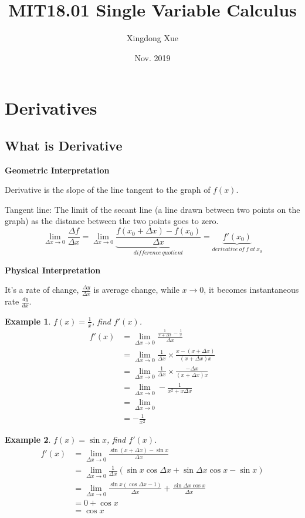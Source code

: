 \documentclass{article}
\title{MIT18.01 Single Variable Calculus}
\author{Xingdong Xue}
\date{Nov. 2019}
\newtheorem{exmp}{Example}
\newcommand\limitdeltaxzero{\lim_{\Delta x \to 0}}
\begin{document}
\maketitle

\section{Derivatives}
\subsection{What is Derivative}

\textbf{Geometric Interpretation}

Derivative is the slope of the line tangent to the graph of $f(x)$.

Tangent line: The limit of the secant line (a line drawn between two points on the graph) as the distance between the two points goes to zero.
$$\limitdeltaxzero \frac{\Delta f}{\Delta x} = \limitdeltaxzero \underbrace{\frac{f(x_0+\Delta x)-f(x_0)}{\Delta x}}_{difference\ quotient} = \underbrace{f'(x_0)}_{derivative\ of\ f\ at\ x_0}$$

\textbf{Physical Interpretation}

It's a rate of change, $\frac{\Delta y}{\Delta x}$ is average change, while $x \rightarrow 0$, it becomes instantaneous rate $\frac{dy}{dx}$.

\begin{exmp}
$f(x) = \frac{1}{x}$, find $f'(x)$.
  \begin{align*}
    f'(x) &= \limitdeltaxzero\frac{\frac{1}{x+\Delta x} - \frac{1}{x}}{\Delta x} \\
          &= \limitdeltaxzero\frac{1}{\Delta x} \times \frac{x - (x+\Delta x)}{(x+\Delta x)x} \\
          &= \limitdeltaxzero\frac{1}{\Delta x} \times \frac{-\Delta x}{(x+\Delta x)x} \\
          &= \limitdeltaxzero-\frac{1}{x^2+x\Delta x} \\
          &= \limitdeltaxzero \\
          &= -\frac{1}{x^2}
  \end{align*}
\end{exmp}

\begin{exmp}
  $f(x) = \sin x$, find $f'(x)$.
  \begin{align*}
    f'(x) &= \limitdeltaxzero\frac{\sin (x+\Delta x) - \sin x}{\Delta x} \\
          &= \limitdeltaxzero\frac{1}{\Delta x}(\sin x \cos \Delta x + \sin \Delta x\cos x - \sin x) \\
          &= \limitdeltaxzero\frac{\sin x(\cos \Delta x -1)}{\Delta x} + \frac{\sin \Delta x \cos x}{\Delta x} \\
          &= 0 + \cos x \\
          &= \cos x
  \end{align*}
\end{exmp}
\end{document}
